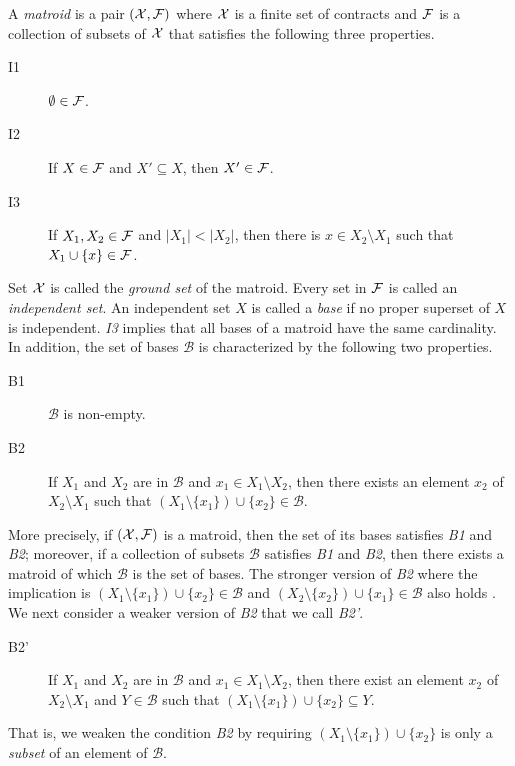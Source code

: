 \documentclass[12pt]{amsart}
\theoremstyle{remark}
\begin{document}
A \emph{matroid} is a pair $(\mathcal{X},\mathcal{F})$ where $\mathcal{X}$ is a finite set of contracts
and $\mathcal{F}$ is a collection of subsets of $\mathcal{X}$ that satisfies the following
three properties.
\begin{description}
  \item[I1] $\emptyset \in \mathcal{F}$.
  \item[I2] If $X \in \mathcal{F}$ and $X' \subseteq X$, then $X' \in \mathcal{F}$.
  \item[I3] If $X_1, X_2 \in \mathcal{F}$ and $|X_1|<|X_2|$, then there is $x \in X_2 \setminus X_1$
  such that $X_1\cup \{x\} \in \mathcal{F}$.
\end{description}

Set $\mathcal{X}$ is called the \emph{ground set} of the matroid. Every set
in $\mathcal{F}$ is called an \emph{independent set}. An independent set $X$
is called a \emph{base} if no proper superset of $X$ is independent.
\emph{I3} implies that all bases of a matroid have the same cardinality.
In addition, the set of bases $\mathcal{B}$ is characterized by the
following two properties.
\begin{description}
  \item[B1] $\mathcal{B}$ is non-empty.
  \item[B2] If $X_1$ and $X_2$ are in $\mathcal{B}$ and $x_1 \in X_1 \setminus X_2$, then there
  exists an element $x_2$ of $X_2 \setminus X_1$ such that $(X_1\setminus \{x_1\}) \cup \{x_2\} \in \mathcal{B}$.
\end{description}
More precisely, if $(\mathcal{X},\mathcal{F})$ is a matroid, then the set of its bases satisfies
\emph{B1} and \emph{B2}; moreover, if a collection of subsets $\mathcal{B}$
satisfies \emph{B1} and \emph{B2}, then there exists a matroid of which
$\mathcal{B}$ is the set of bases.
The stronger version of \emph{B2} where the implication is
$(X_1\setminus \{x_1\}) \cup \{x_2\} \in \mathcal{B}$ and
$(X_2\setminus \{x_2\}) \cup \{x_1\} \in \mathcal{B}$ also holds \citep{brualdi1969}. \label{strongerB2}
We next consider a weaker version of \emph{B2} that we call \emph{B2'}.
\begin{description}
  \item[B2'] If $X_1$ and $X_2$ are in $\mathcal{B}$ and $x_1 \in X_1 \setminus X_2$, then there exist an element $x_2$ of $X_2 \setminus X_1$ and $Y\in \mathcal{B}$ such that
  $(X_1\setminus \{x_1\}) \cup \{x_2\} \subseteq Y$.
\end{description}
That is, we weaken the condition \emph{B2} by requiring
$(X_1\setminus \{x_1\}) \cup \{x_2\}$ is only a \textit{subset} of
an element of $\mathcal B$.
\end{document}
